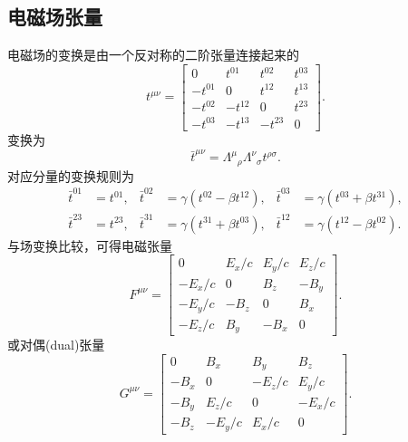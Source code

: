 \subsection{电磁场张量}
电磁场的变换是由一个反对称的二阶张量连接起来的
\[
    t^{\mu\nu}=
    \begin{bmatrix}
        0&t^{01}&t^{02}&t^{03}\\
        -t^{01}&0&t^{12}&t^{13}\\
        -t^{02}&-t^{12}&0&t^{23}\\
        -t^{03}&-t^{13}&-t^{23}&0
    \end{bmatrix}.
\]
变换为 
\[
    \bar t^{\mu\nu}=\Lambda^\mu{}_\rho\Lambda^\nu{}_\sigma t^{\rho\sigma}.
\]
对应分量的变换规则为
\begin{align*}
    \bar t^{01}&=t^{01},&\bar t^{02}&=\gamma(t^{02}-\beta t^{12}),&\bar t^{03}&=\gamma(t^{03}+\beta t^{31}),\\
    \bar t^{23}&=t^{23},&\bar t^{31}&=\gamma(t^{31}+\beta t^{03}),&\bar t^{12}&=\gamma(t^{12}-\beta t^{02}).
\end{align*}
与场变换比较，可得电磁张量
\begin{equation}
    F^{\mu\nu}=
    \begin{bmatrix}
        0&E_x/c&E_y/c&E_z/c\\
        -E_x/c&0&B_z&-B_y\\
        -E_y/c&-B_z&0&B_x\\
        -E_z/c&B_y&-B_x&0
    \end{bmatrix}.
\end{equation}
或对偶(dual)张量
\begin{equation}
    G^{\mu\nu}=
    \begin{bmatrix}
        0&B_x&B_y&B_z\\
        -B_x&0&-E_z/c&E_y/c\\
        -B_y&E_z/c&0&-E_x/c\\
        -B_z&-E_y/c&E_x/c&0
    \end{bmatrix}.
\end{equation}
